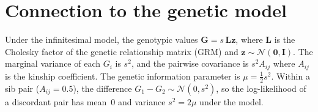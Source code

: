 \documentclass[12pt]{article}
\begin{document}
\section*{Connection to the genetic model}

Under the infinitesimal model, the genotypic values $\bm{G} = s\,\bm{L}\bm{z}$,
where $\bm{L}$ is the Cholesky factor of the genetic relationship matrix (GRM)
and $\bm{z} \sim \mathcal{N}(\bm{0}, \bm{I})$.  The marginal variance of each
$G_i$ is $s^2$, and the pairwise covariance is $s^2 A_{ij}$ where $A_{ij}$ is
the kinship coefficient.  The genetic information parameter is
$\mu = \tfrac{1}{2}s^2$.  Within a sib pair ($A_{ij} = 0.5$), the difference
$G_1 - G_2 \sim \mathcal{N}(0, s^2)$, so the log-likelihood of a discordant
pair has mean~0 and variance $s^2 = 2\mu$ under the model.
\end{document}
